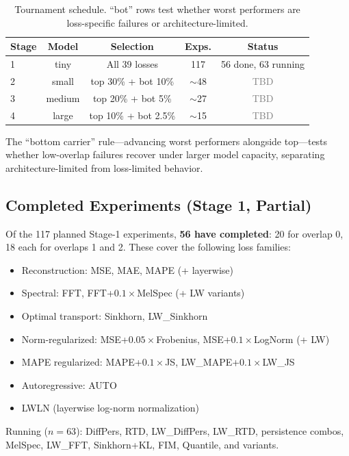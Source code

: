 \begin{table}[h]
\centering\small
\begin{tabular}{lcccc}
\hline
\textbf{Stage} & \textbf{Model} & \textbf{Selection} & \textbf{Exps.} & \textbf{Status} \\
\hline
1 & tiny   & All 39 losses     & 117 & 56 done, 63 running \\
2 & small  & top 30\% + bot 10\% & $\sim$48 & \textcolor{gray}{TBD} \\
3 & medium & top 20\% + bot 5\%  & $\sim$27 & \textcolor{gray}{TBD} \\
4 & large  & top 10\% + bot 2.5\% & $\sim$15 & \textcolor{gray}{TBD} \\
\hline
\end{tabular}
\caption{Tournament schedule. ``bot'' rows test whether worst performers are loss-specific failures or architecture-limited.}
\label{tab:tournament}
\end{table}

The ``bottom carrier'' rule---advancing worst performers alongside top---tests whether low-overlap failures recover under larger model capacity, separating architecture-limited from loss-limited behavior.

\subsection{Completed Experiments (Stage 1, Partial)}

Of the 117 planned Stage-1 experiments, \textbf{56 have completed}: 20 for overlap 0, 18 each for overlaps 1 and 2. These cover the following loss families:
\begin{itemize}
    \item Reconstruction: MSE, MAE, MAPE (+ layerwise)
    \item Spectral: FFT, FFT+$0.1\times$MelSpec (+ LW variants)
    \item Optimal transport: Sinkhorn, LW\_Sinkhorn
    \item Norm-regularized: MSE+$0.05\times$Frobenius, MSE+$0.1\times$LogNorm (+ LW)
    \item MAPE regularized: MAPE+$0.1\times$JS, LW\_MAPE+$0.1\times$LW\_JS
    \item Autoregressive: AUTO
    \item LWLN (layerwise log-norm normalization)
\end{itemize}

Running ($n=63$): DiffPers, RTD, LW\_DiffPers, LW\_RTD, persistence combos, MelSpec, LW\_FFT, Sinkhorn+KL, FIM, Quantile, and variants.


